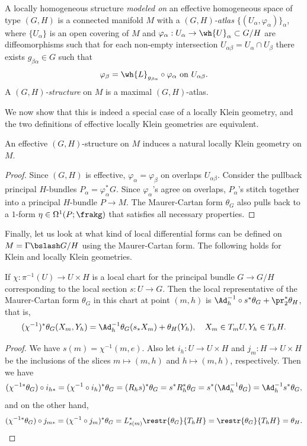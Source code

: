 \begin{defn}
    A locally homogeneous structure \emph{modeled on} an effective homogeneous space of type $(G,H)$ is a connected manifold $M$ with a \emph{$(G,H)$-atlas} $\{(U_\alpha,\varphi_\alpha)\}_\alpha$, where $\{U_\alpha\}$ is an open covering of $M$ and $\varphi_\alpha:U_\alpha\to \wh{U}_{\alpha}\subset G\slash H$ are diffeomorphisms such that for each non-empty intersection $U_{\alpha\beta}=U_\alpha\cap U_\beta$ there exists $g_{\beta\alpha}\in G$ such that 
    \[\varphi_{\beta}=\wh{L}_{g_{\beta\alpha}}\circ \varphi_\alpha\text{ on }U_{\alpha\beta}.\]
    A \emph{$(G,H)$-structure} on $M$ is a maximal $(G,H)$-atlas.
\end{defn}

We now show that this is indeed a special case of a locally Klein geometry, and the two definitions of effective locally Klein geometries are equivalent.

\begin{prop}
    An effective $(G,H)$-structure on $M$ induces a natural locally Klein geometry on $M$.
\end{prop}
\begin{proof}
    Since $(G,H)$ is effective, $\varphi_\alpha=\varphi_\beta$ on overlaps $U_{\alpha\beta}$. Consider the pullback principal $H$-bundles $P_\alpha=\varphi_\alpha^\ast G$. Since $\varphi_\alpha$'s agree on overlaps, $P_\alpha$'s stitch together into a principal $H$-bundle $P\to M$. The Maurer-Cartan form $\theta_G$ also pulls back to a $1$-form $\eta\in\Omega^1(P;\frakg)$ that satisfies all necessary properties.
\end{proof}


Finally, let us look at what kind of local differential forms can be defined on $M=\Gamma\bslash G\slash H$ using the Maurer-Cartan form. The following holds for Klein and locally Klein geometries.

\begin{prop}\label{prop 4.7.1 Sharpe}
    If $\chi:\pi^{-1}(U)\to U\times H$ is a local chart for the principal bundle $G\to G\slash H$ corresponding to the local section $ s:U\to G$. Then the local representative of the Maurer-Cartan form $\theta_G$ in this chart at point $(m,h)$ is $\Ad_h^{-1}\circ  s^\ast\theta_G +\pr_2^\ast\theta_H$, that is,
    \[(\chi^{-1})^\ast\theta_G(X_m,Y_h)=\Ad_h^{-1}\theta_G( s_\ast X_m)+\theta_H(Y_h),\quad X_m\in T_mU,Y_h\in T_h H.\]
\end{prop}
\begin{proof}
    We have $ s(m)=\chi^{-1}(m,e)$. Also let $i_h:U\to U\times H$ and $j_m:H\to U\times H$ be the inclusions of the slices $m\mapsto (m,h)$ and $h\mapsto (m,h)$, respectively. Then we have
    \[(\chi^{-1\ast}\theta_G)\circ i_{h\ast}=(\chi^{-1}\circ i_h)^\ast \theta_G=(R_h s)^\ast \theta_G= s^\ast R_h^\ast \theta_G= s^\ast(\Ad_h^{-1}\theta_G)=\Ad_h^{-1} s^\ast \theta_G,\]
    and on the other hand, 
    \[(\chi^{-1\ast}\theta_G)\circ j_{m\ast}=(\chi^{-1}\circ j_m)^\ast \theta_G=L_{ s(m)}^\ast\restr{\theta_G}{T_hH}=\restr{\theta_G}{T_hH}=\theta_H.\]
\end{proof}

